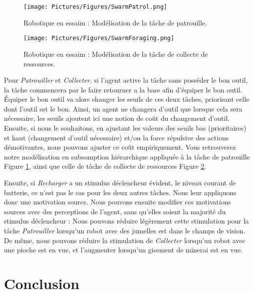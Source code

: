	\begin{figure}
	\centering
	\texttt{[image: Pictures/Figures/SwarmPatrol.png]}
	\caption{Robotique en essaim : Modélisation de la tâche de patrouille.}
	\label{swarmPatrol}
	\end{figure}
	
	\begin{figure}	
	\centering
	\texttt{[image: Pictures/Figures/SwarmForaging.png]}
	\caption{Robotique en essaim : Modélisation de la tâche de collecte de ressources.}
	\label{swarmForaging}
	\end{figure}
		
		Pour \textit{Patrouiller} et \textit{Collecter}, si l'agent active la tâche sans posséder le bon outil, la tâche commencera par le faire retourner a la base afin d'équiper le bon outil. Équiper le bon outil va alors changer les seuils de ces deux tâches, priorisant celle dont l'outil est le bon. Ainsi, un agent ne changera d'outil que lorsque cela sera nécessaire, les seuils ajoutent ici une notion de coût du changement d'outil. Ensuite, si nous le souhaitons, en ajustant les valeurs des seuils bas (prioritaires) et haut (changement d'outil nécessaire) et/ou la force répulsive des actions démotivantes, nous pouvons ajuster ce coût empiriquement. Vous retrouverez notre modélisation en subsomption hiérarchique appliquée à la tâche de patrouille Figure \ref{swarmPatrol}, ainsi que celle de tâche de collecte de ressources Figure \ref{swarmForaging}.
		
		Ensuite, si \textit{Recharger} a un stimulus déclencheur évident, le niveau courant de batterie, ce n'est pas le cas pour les deux autres tâches. Nous leur appliquons donc une motivation source. Nous pouvons ensuite modifier ces motivations sources avec des perceptions de l'agent, sans qu'elles soient la majorité du stimulus déclencheur : Nous pouvons réduire légèrement cette stimulation pour la tâche \textit{Patrouiller} lorsqu'un robot avec des jumelles est dans le champs de vision. De même, nous pouvons réduire la stimulation de \textit{Collecter} lorsqu'un robot avec une pioche est en vue, et l'augmenter lorsqu'un gisement de minerai est en vue.
			
			
				
	\section*{Conclusion}
